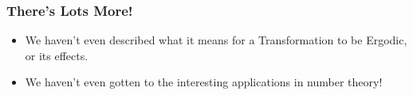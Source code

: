 \documentclass{beamer}
\begin{document}
\begin{frame}
\frametitle{There's Lots More!}
\begin{itemize}
    \item<1-> We haven't even described what it means for a Transformation to be Ergodic, or its effects.
    \item<2-> We haven't even gotten to the interesting applications in number theory!
\end{itemize}
\end{frame}
\end{document}
